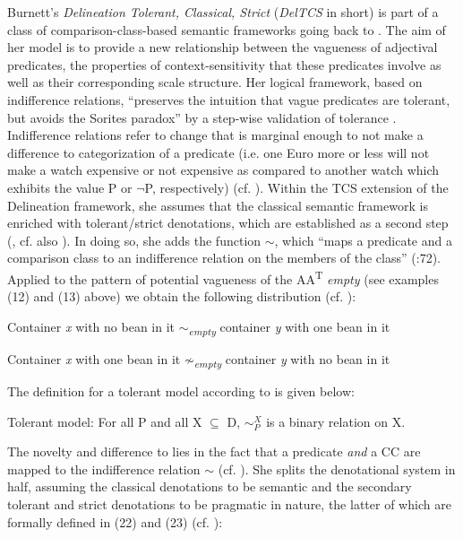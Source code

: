 \documentclass[output=paper
,modfonts
,nonflat]{langsci/langscibook}
\begin{document}
Burnett's \textit{Delineation Tolerant, Classical, Strict} (\textit{DelTCS} in short) is part of a class of comparison-class-based semantic frameworks going back to 
\citet{Klein1980}. The aim of her model is to provide a new relationship between the vagueness of adjectival predicates, the properties of context-sensitivity that these predicates involve as well as their corresponding scale structure. Her logical framework, based on indifference relations, ``preserves the intuition that vague predicates are tolerant, but avoids the Sorites paradox'' by a step-wise validation of tolerance \textcite[28]{Burnett2017}. Indifference relations refer to change that is marginal enough to not make a difference to categorization of a predicate (i.e. one Euro more or less will not make a watch expensive or not expensive as compared to another watch which exhibits the value P or $\neg$P, respectively) (cf. \textcite[1]{Burnett2017}). Within the TCS extension of the Delineation framework, she assumes that the classical semantic framework is enriched with tolerant/strict denotations, which are established as a second step (\textcite[72]{Burnett2017}, cf. also \citet{Cobreros2012}). In doing so, she adds the function $\sim$, which ``maps a predicate and a comparison class to an indifference relation on the members of the class'' (\citeyear{Burnett2017}:72). Applied to the pattern of potential vagueness of the AA\textsuperscript{T} \textit{empty} (see examples (12) and (13) above) we obtain the following distribution (cf. \textcite[76]{Burnett2017}):
\begin{examples}
	\item Container \textit{x} with no bean in it $\sim$\textsubscript{\textit{empty}} container \textit{y} with one bean in it
	\item Container \textit{x} with one bean in it $\not\sim$\textsubscript{\textit{empty}} container \textit{y} with no bean in it
\end{examples}

The definition for a tolerant model according to \textcite[72]{Burnett2017} is given below:
\begin{examples}
	\item Tolerant model: For all P and all X $\subseteq$ D, $\sim_P^X$ is a binary relation on X.
\end{examples}

The novelty and difference to \citet{Cobreros2012} lies in the fact that a predicate \textit{and} a CC are mapped to the indifference relation $\sim$ (cf. \textcite[72]{Burnett2017}). 
She splits the denotational system in half, assuming the classical denotations to be semantic and the secondary tolerant and strict denotations to be pragmatic in nature, the latter of which are formally defined in (22) and (23) (cf. \textcite[73]{Burnett2017}):
\end{document}
